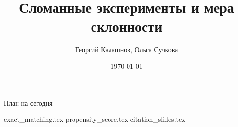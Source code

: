 \documentclass[handout,12pt]{beamer}
\title{Сломанные эксперименты и мера склонности}
\author[Георгий Калашнов, Ольга Сучкова]{Георгий Калашнов, Ольга Сучкова}
\date{\today}
\begin{document}
\begin{frame}
  \titlepage
  
\end{frame}


\begin{frame}{План на сегодня} 
\tableofcontents
\end{frame}

{exact_matching.tex}
{propensity_score.tex}
{citation_slides.tex}
\end{document}
